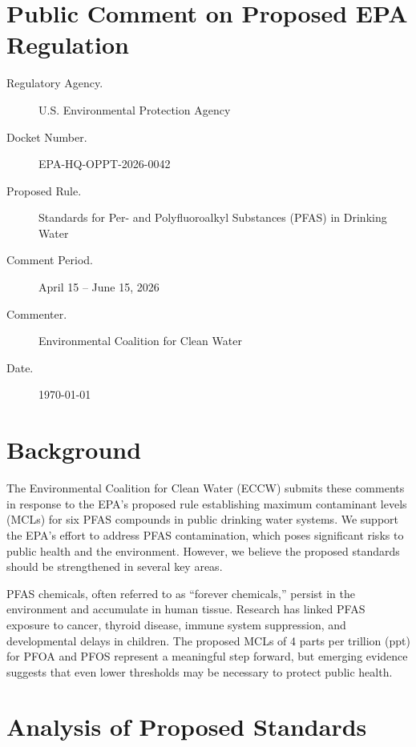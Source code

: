 \documentclass[
    language=english,
    doctype=public-comment,
    institution=none,
]{../../omnilatex}
\begin{document}
\maketitle

\section*{Public Comment on Proposed EPA Regulation}

\begin{description}
    \item[Regulatory Agency.] U.S. Environmental Protection Agency
    \item[Docket Number.] EPA-HQ-OPPT-2026-0042
    \item[Proposed Rule.] Standards for Per- and Polyfluoroalkyl Substances
          (PFAS) in Drinking Water
    \item[Comment Period.] April 15 -- June 15, 2026
    \item[Commenter.] Environmental Coalition for Clean Water
    \item[Date.] \today
\end{description}

\section{Background}

The Environmental Coalition for Clean Water (ECCW) submits these comments
in response to the EPA's proposed rule establishing maximum contaminant
levels (MCLs) for six PFAS compounds in public drinking water systems. We
support the EPA's effort to address PFAS contamination, which poses
significant risks to public health and the environment. However, we believe
the proposed standards should be strengthened in several key areas.

PFAS chemicals, often referred to as ``forever chemicals,'' persist in the
environment and accumulate in human tissue. Research has linked PFAS exposure
to cancer, thyroid disease, immune system suppression, and developmental
delays in children. The proposed MCLs of 4 parts per trillion (ppt) for
PFOA and PFOS represent a meaningful step forward, but emerging evidence
suggests that even lower thresholds may be necessary to protect public
health.

\section{Analysis of Proposed Standards}
\end{document}
